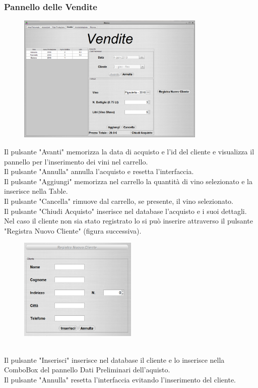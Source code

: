 \documentclass{article}
\begin{document}
\subsubsection{Pannello delle Vendite}
\begin{figure}[htbp]
\centering
\includegraphics[width=0.8\textwidth]{img/panel_vendite.png}
\end{figure}
Il pulsante "Avanti" memorizza la data di acquisto e l'id del cliente e visualizza il pannello per l'inserimento dei vini nel carrello.\\
Il pulsante "Annulla" annulla l'acquisto e resetta l'interfaccia.\\
Il pulsante "Aggiungi" memorizza nel carrello la quantità di vino selezionato e la inserisce nella Table.\\
Il pulsante "Cancella" rimuove dal carrello, se presente,  il vino selezionato.\\
Il pulsante "Chiudi Acquisto" inserisce nel database l'acquisto e i suoi dettagli.\\
\newline
Nel caso il cliente non sia stato registrato lo si può inserire attraverso il pulsante "Registra Nuovo Cliente" (figura successiva).\\
\begin{figure}[htbp]
\centering
\includegraphics[width=0.5\textwidth]{img/panel_client.png}
\end{figure}\\
Il pulsante "Inserisci" inserisce nel database il cliente e lo inserisce nella ComboBox del pannello Dati Preliminari dell'aquisto.\\
Il pulsante "Annulla" resetta l'interfaccia evitando l'inserimento del cliente.\\
\newpage
\end{document}
